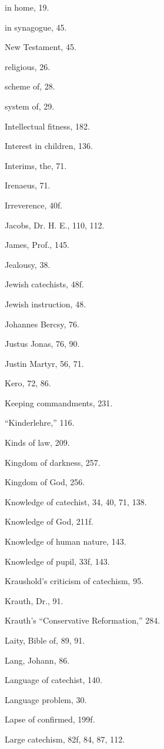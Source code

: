 \begin{originalinhalt}
in home, 19.

in synagogue, 45.

New Testament, 45.

religious, 26.

scheme of, 28.

system of, 29.

Intellectual fitness, 182.

Interest in children, 136.

Interims, the, 71.

Irenaeus, 71.

Irreverence, 40f.


Jacobs, Dr. H. E., 110, 112.

James, Prof., 145.

Jealousy, 38.

Jewish catechists, 48f.

Jewish instruction, 48.

Johannes Bercsy, 76.

Justus Jonas, 76, 90.

Justin Martyr, 56, 71.


Kero, 72, 86.

Keeping commandments, 231.

“Kinderlehre,” 116.

Kinds of law, 209.

Kingdom of darkness, 257.

Kingdom of God, 256.

Knowledge of catechist, 34, 40, 71, 138.

Knowledge of God, 211f.

Knowledge of human nature, 143.

Knowledge of pupil, 33f, 143.

Kraushold’s criticism of catechism, 95.

Krauth, Dr., 91.

Krauth’s “Conservative Reformation,” 284.


Laity, Bible of, 89, 91.

Lang, Johann, 86.

Language of catechist, 140.

Language problem, 30.

Lapse of confirmed, 199f.

Large catechism, 82f, 84, 87, 112.


\end{originalinhalt}
